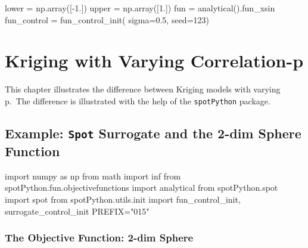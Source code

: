 \documentclass[
  letterpaper,
  DIV=11,
  numbers=noendperiod]{scrreprt}
\newenvironment{Shaded}{\begin{snugshade}}{\end{snugshade}}
\newcommand{\DecValTok}[1]{\textcolor[rgb]{0.68,0.00,0.00}{#1}}
\newcommand{\FloatTok}[1]{\textcolor[rgb]{0.68,0.00,0.00}{#1}}
\newcommand{\ImportTok}[1]{\textcolor[rgb]{0.00,0.46,0.62}{#1}}
\newcommand{\NormalTok}[1]{\textcolor[rgb]{0.00,0.23,0.31}{#1}}
\newcommand{\OperatorTok}[1]{\textcolor[rgb]{0.37,0.37,0.37}{#1}}
\newcommand{\StringTok}[1]{\textcolor[rgb]{0.13,0.47,0.30}{#1}}
\begin{document}
\begin{Shaded}
\begin{Highlighting}[]
\NormalTok{lower }\OperatorTok{=}\NormalTok{ np.array([}\OperatorTok{{-}}\FloatTok{1.}\NormalTok{])}
\NormalTok{upper }\OperatorTok{=}\NormalTok{ np.array([}\FloatTok{1.}\NormalTok{])}
\NormalTok{fun }\OperatorTok{=}\NormalTok{ analytical().fun\_xsin}
\NormalTok{fun\_control }\OperatorTok{=}\NormalTok{ fun\_control\_init(    }
\NormalTok{    sigma}\OperatorTok{=}\FloatTok{0.5}\NormalTok{,}
\NormalTok{    seed}\OperatorTok{=}\DecValTok{123}\NormalTok{)}
\end{Highlighting}
\end{Shaded}

\chapter{Kriging with Varying
Correlation-p}\label{sec-num-spot-correlation-p}

This chapter illustrates the difference between Kriging models with
varying p.~The difference is illustrated with the help of the
\texttt{spotPython} package.

\section{\texorpdfstring{Example: \texttt{Spot} Surrogate and the 2-dim
Sphere
Function}{Example: Spot Surrogate and the 2-dim Sphere Function}}\label{example-spot-surrogate-and-the-2-dim-sphere-function}

\begin{Shaded}
\begin{Highlighting}[]
\ImportTok{import}\NormalTok{ numpy }\ImportTok{as}\NormalTok{ np}
\ImportTok{from}\NormalTok{ math }\ImportTok{import}\NormalTok{ inf}
\ImportTok{from}\NormalTok{ spotPython.fun.objectivefunctions }\ImportTok{import}\NormalTok{ analytical}
\ImportTok{from}\NormalTok{ spotPython.spot }\ImportTok{import}\NormalTok{ spot}
\ImportTok{from}\NormalTok{ spotPython.utils.init }\ImportTok{import}\NormalTok{ fun\_control\_init, surrogate\_control\_init}
\NormalTok{PREFIX}\OperatorTok{=}\StringTok{"015"}
\end{Highlighting}
\end{Shaded}

\subsection{The Objective Function: 2-dim
Sphere}\label{the-objective-function-2-dim-sphere-1}
\end{document}
